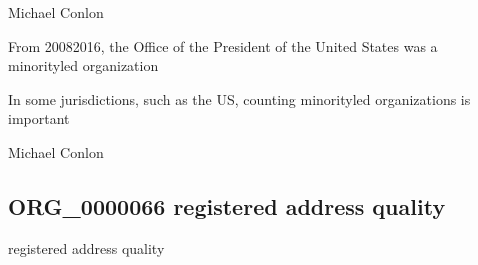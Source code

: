 \documentclass[letterpaper,10pt,english]{sphinxmanual}
\begin{document}
\begin{sphinxShadowBox}

\sphinxAtStartPar
Michael Conlon 
\end{sphinxShadowBox}

\begin{sphinxShadowBox}

\sphinxAtStartPar
From 2008\sphinxhyphen{}2016, the Office of the President of the United States was a minority\sphinxhyphen{}led organization
\end{sphinxShadowBox}

\begin{sphinxShadowBox}

\sphinxAtStartPar
In some jurisdictions, such as the US, counting minority\sphinxhyphen{}led organizations is important
\end{sphinxShadowBox}

\begin{sphinxShadowBox}

\sphinxAtStartPar
Michael Conlon 
\end{sphinxShadowBox}
\begin{quote}

\ignorespaces \end{quote}


\subsection{ORG\_0000066 \sphinxhyphen{} registered address quality}
\label{\detokenize{doc-ORG_0000066:org-0000066-registered-address-quality}}\label{\detokenize{doc-ORG_0000066:index-0}}\label{\detokenize{doc-ORG_0000066::doc}}
\begin{sphinxShadowBox}

\sphinxAtStartPar
registered address quality
\end{sphinxShadowBox}

\begin{sphinxShadowBox}

\sphinxAtStartPar
{\hyperref[\detokenize{doc-BFO_0000019::doc}]{}}
\end{sphinxShadowBox}
\end{document}
